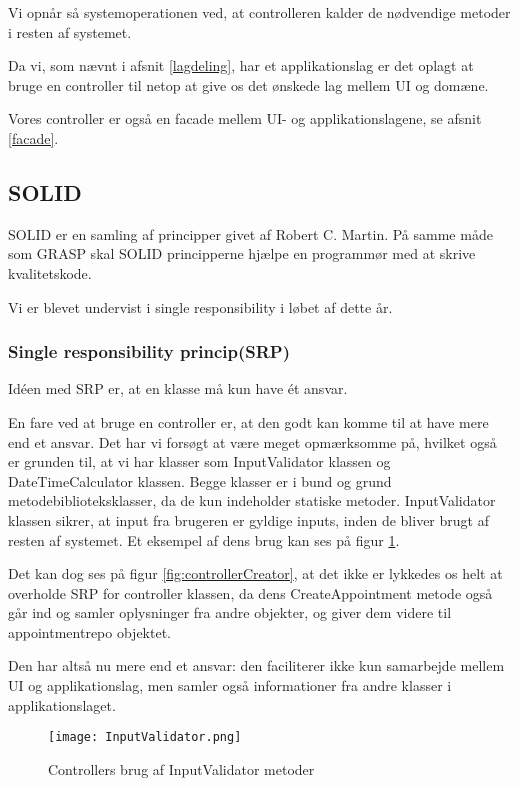 Vi opnår så systemoperationen ved, at controlleren kalder de nødvendige metoder i resten af systemet.

Da vi, som nævnt i afsnit \ref{lagdeling}, har et applikationslag er det oplagt at bruge en controller til netop at give os det ønskede lag mellem UI og domæne.

Vores controller er også en facade mellem UI- og applikationslagene, se afsnit \ref{facade}.

\subsection{SOLID}
\label{solid}

SOLID er en samling af principper givet af Robert C. Martin.
På samme måde som GRASP skal SOLID principperne hjælpe en programmør med at skrive kvalitetskode.

Vi er blevet undervist i single responsibility i løbet af dette år.

\subsubsection{Single responsibility princip(SRP)}
\label{SRP}

Idéen med SRP er, at en klasse må kun have ét ansvar.\cite{solid}

En fare ved at bruge en controller er, at den godt kan komme til at have mere end et ansvar.
Det har vi forsøgt at være meget opmærksomme på, hvilket også er grunden til, at vi har klasser som InputValidator klassen og DateTimeCalculator klassen.
Begge klasser er i bund og grund metodebiblioteksklasser, da de kun indeholder statiske metoder.
InputValidator klassen sikrer, at input fra brugeren er gyldige inputs, inden de bliver brugt af resten af systemet.
Et eksempel af dens brug kan ses på figur \ref{fig:InputValidator}.

Det kan dog ses på figur \ref{fig:controllerCreator}, at det ikke er lykkedes os helt at overholde SRP for controller klassen, da dens CreateAppointment metode også går ind og samler oplysninger fra andre objekter, og giver dem videre til appointmentrepo objektet.

Den har altså nu mere end et ansvar: den faciliterer ikke kun samarbejde mellem UI og applikationslag, men samler også informationer fra andre klasser i applikationslaget.

\begin{figure}[h]
    \caption{Controllers brug af InputValidator metoder}
    \centering
        \texttt{[image: InputValidator.png]}
    \label{fig:InputValidator}
\end{figure}

